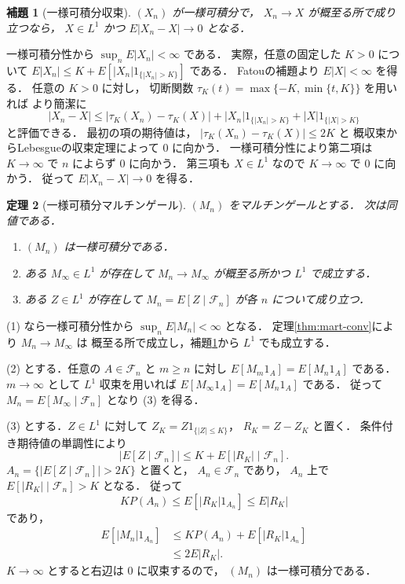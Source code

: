 \documentclass[a5paper,10pt,onecolumn]{jsarticle}
\makeatletter
\theoremstyle{mathnotetheorem}
\newtheorem{theorem}{定理}[section]
\newtheorem{lemma}[theorem]{補題}
\renewcommand{\proofname}{証明}
\renewenvironment{proof}[1][\proofname]{%
  \par\pushQED{\qed}\normalfont\topsep4\p@\@plus2\p@\relax
  \trivlist\item[\hskip\labelsep\bfseries #1]\ignorespaces
}{\popQED\endtrivlist\@endpefalse}
\makeatother
\begin{document}
\begin{lemma}[一様可積分収束]\label{lem:ui-vitali}
$(X_n)$ が一様可積分で，
$X_n\to X$ が概至る所で成り立つなら，
$X\in L^1$ かつ $E|X_n-X|\to0$ となる．
\end{lemma}
\begin{proof}
一様可積分性から $\sup_nE|X_n|<\infty$ である．
実際，任意の固定した $K>0$ について
$E|X_n|\le K+E[|X_n|1_{\{|X_n|>K\}}]$ である．
Fatouの補題より $E|X|<\infty$ を得る．
任意の $K>0$ に対し，
切断関数
$\tau_K(t)=\max\{-K,\min\{t,K\}\}$ を用いれば
より簡潔に
\[
 |X_n-X|
 \le|\tau_K(X_n)-\tau_K(X)|
    +|X_n|1_{\{|X_n|>K\}}
    +|X|1_{\{|X|>K\}}
\]
と評価できる．
最初の項の期待値は，
$|\tau_K(X_n)-\tau_K(X)|\le2K$ と
概収束からLebesgueの収束定理によって $0$ に向かう．
一様可積分性により第二項は $K\to\infty$ で
$n$ によらず $0$ に向かう．
第三項も $X\in L^1$ なので $K\to\infty$ で $0$ に向かう．
従って $E|X_n-X|\to0$ を得る．
\end{proof}

\begin{theorem}[一様可積分マルチンゲール]\label{thm:ui-mart}
$(M_n)$ をマルチンゲールとする．
次は同値である．
\begin{enumerate}
\item $(M_n)$ は一様可積分である．
\item ある $M_\infty\in L^1$ が存在して
$M_n\to M_\infty$ が概至る所かつ $L^1$ で成立する．
\item ある $Z\in L^1$ が存在して
$M_n=E[Z\mid\mathcal F_n]$ が各 $n$ について成り立つ．
\end{enumerate}
\end{theorem}
\begin{proof}
(1) なら一様可積分性から $\sup_nE|M_n|<\infty$ となる．
定理\ref{thm:mart-conv}により $M_n\to M_\infty$ は
概至る所で成立し，補題\ref{lem:ui-vitali}から $L^1$ でも成立する．

(2) とする．任意の $A\in\mathcal F_n$ と $m\ge n$ に対し
$E[M_m1_A]=E[M_n1_A]$ である．
$m\to\infty$ として $L^1$ 収束を用いれば
$E[M_\infty1_A]=E[M_n1_A]$ である．
従って $M_n=E[M_\infty\mid\mathcal F_n]$ となり (3) を得る．

(3) とする．$Z\in L^1$ に対して
$Z_K=Z1_{\{|Z|\le K\}}$，
$R_K=Z-Z_K$ と置く．
条件付き期待値の単調性により
\[
 |E[Z\mid\mathcal F_n]|
 \le K+E[|R_K|\mid\mathcal F_n].
\]
$A_n=\{|E[Z\mid\mathcal F_n]|>2K\}$ と置くと，
$A_n\in\mathcal F_n$ であり，
$A_n$ 上で $E[|R_K|\mid\mathcal F_n]>K$ となる．
従って
\[
 KP(A_n)\le E[|R_K|1_{A_n}]\le E|R_K|
\]
であり，
\begin{align*}
 E[|M_n|1_{A_n}]
 &\le KP(A_n)+E[|R_K|1_{A_n}]\\
 &\le 2E|R_K|.
\end{align*}
$K\to\infty$ とすると右辺は $0$ に収束するので，
$(M_n)$ は一様可積分である．
\end{proof}
\end{document}
